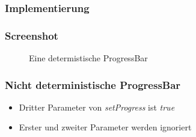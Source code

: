 \begin{frame}
   \frametitle{Implementierung}
   
\end{frame}

\begin{frame}
   \frametitle{Screenshot}
   \begin{figure}[h!]
     \centering
     \hfill
     \caption{
        Eine determistische ProgressBar
     }
     \label{fig:determinateProgress}
   \end{figure}
\end{frame}

\begin{frame}
   \frametitle{Nicht deterministische ProgressBar}
   \begin{itemize}
      \item Dritter Parameter von \emph{setProgress} ist \emph{true}
      \item Erster und zweiter Parameter werden ignoriert
   \end{itemize}

   
\end{frame}

